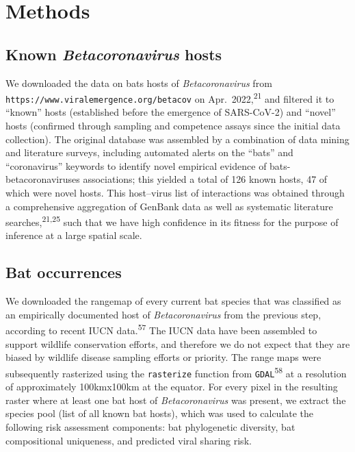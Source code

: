 \documentclass[10pt,oneside]{article}
\begin{document}
\newpage

\hypertarget{methods}{%
\section{Methods}\label{methods}}

\hypertarget{known-betacoronavirus-hosts}{%
\subsection{\texorpdfstring{Known \emph{Betacoronavirus}
hosts}{Known Betacoronavirus hosts}}\label{known-betacoronavirus-hosts}}

We downloaded the data on bats hosts of \emph{Betacoronavirus} from
\texttt{https://www.viralemergence.org/betacov} on
Apr.~2022,\textsuperscript{21} and filtered it to ``known'' hosts
(established before the emergence of SARS-CoV-2) and ``novel'' hosts
(confirmed through sampling and competence assays since the initial data
collection). The original database was assembled by a combination of
data mining and literature surveys, including automated alerts on the
``bats'' and ``coronavirus'' keywords to identify novel empirical
evidence of bats-betacoronaviruses associations; this yielded a total of
126 known hosts, 47 of which were novel hosts. This host--virus list of
interactions was obtained through a comprehensive aggregation of GenBank
data as well as systematic literature searches,\textsuperscript{21,25}
such that we have high confidence in its fitness for the purpose of
inference at a large spatial scale.

\hypertarget{bat-occurrences}{%
\subsection{Bat occurrences}\label{bat-occurrences}}

We downloaded the rangemap of every current bat species that was
classified as an empirically documented host of \emph{Betacoronavirus}
from the previous step, according to recent IUCN
data.\textsuperscript{57} The IUCN data have been assembled to support
wildlife conservation efforts, and therefore we do not expect that they
are biased by wildlife disease sampling efforts or priority. The range
maps were subsequently rasterized using the \texttt{rasterize} function
from \texttt{GDAL}\textsuperscript{58} at a resolution of approximately
100kmx100km at the equator. For every pixel in the resulting raster
where at least one bat host of \emph{Betacoronavirus} was present, we
extract the species pool (list of all known bat hosts), which was used
to calculate the following risk assessment components: bat phylogenetic
diversity, bat compositional uniqueness, and predicted viral sharing
risk.
\end{document}
